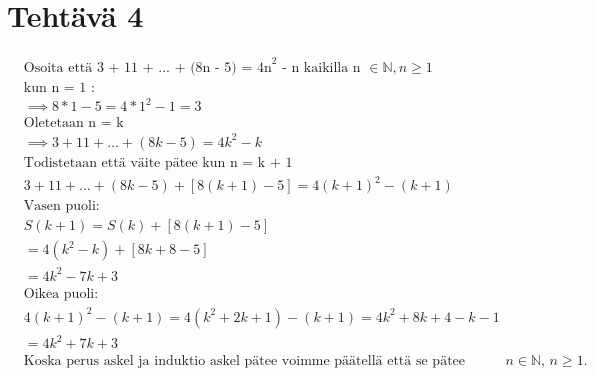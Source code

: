 \documentclass{article}
\begin{document}
	\section*{Tehtävä 4}
    \[
        \begin{aligned}
            &\text{Osoita että 3 + 11 + ... + (8n - 5) = 4n}^2 \text{ - n kaikilla n } \in \mathbb{N}, n \geq 1 \\[15pt]
            &\text{kun n = 1 :} \\
            &\implies 8 * 1 - 5 = 4 * 1^2 - 1 = 3\\[15pt]
            &\text{Oletetaan n = k} \\
            &\implies 3 + 11 + ... + (8k - 5) = 4k^2 - k\\[15pt]
            &\text{Todistetaan että väite pätee kun n = k + 1} \\
            &3 + 11 + ... + (8k - 5) + [8(k + 1) - 5] = 4(k + 1)^2 - (k + 1)\\[15pt]
            &\text{Vasen puoli:} \\
            &S(k + 1) = S(k) + [8(k + 1) - 5]\\
            &= 4(k^2 - k) + [8k + 8 - 5]\\
            &= 4k^2 - 7k + 3\\[15pt]
            &\text{Oikea puoli:} \\
            &4(k + 1)^2 - (k + 1) = 4(k^2 +2k + 1)  - (k + 1) = 4k^2 + 8k + 4 - k - 1\\
            &= 4k^2 + 7k + 3\\[15pt]
            &\text{Koska perus askel ja induktio askel pätee voimme päätellä että se pätee kaikilla $n \in \mathbb{N}$, $n \geq 1$.} \\
        \end{aligned}
    \]
    \newpage
\end{document}
